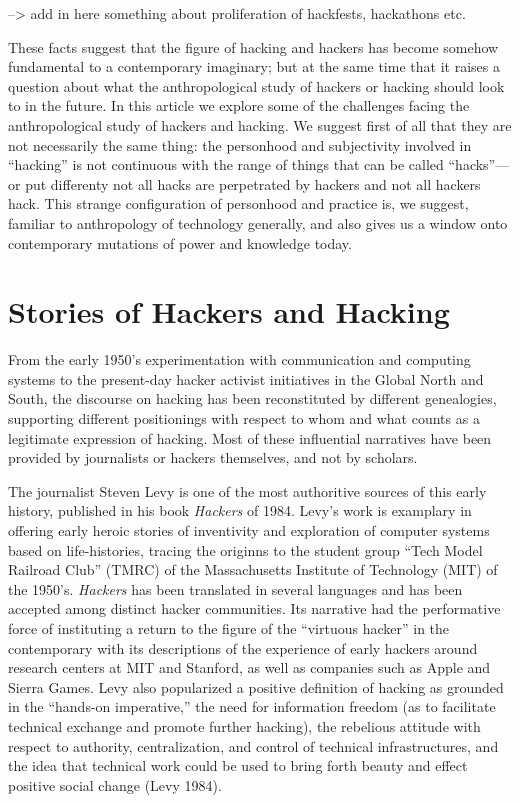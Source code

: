 \documentclass[10pt,letter,oneside]{scrartcl}
\begin{document}
--> add in here something about proliferation of hackfests, hackathons etc. 

These facts suggest that the figure of hacking and hackers has become somehow fundamental to a contemporary imaginary; but at the same time that it raises a question about what the anthropological study of hackers or hacking should look to in the future.  In this article we explore some of the challenges facing the anthropological study of hackers and hacking.  We suggest first of all that they are not necessarily the same thing:  the personhood and subjectivity involved in ``hacking'' is not continuous with the range of things that can be called ``hacks''---or put differenty not all hacks are perpetrated by hackers and not all hackers hack.   This strange configuration of personhood and practice is, we suggest, familiar to anthropology of technology generally, and also gives us a window onto contemporary mutations of power and knowledge today.

\section*{Stories of Hackers and Hacking}

From the early 1950's experimentation with communication and computing systems to the present-day hacker activist initiatives in the Global North and South, the discourse on hacking has been reconstituted by different genealogies, supporting different positionings with respect to whom and what counts as a legitimate expression of hacking.  Most of these influential narratives have been provided by journalists or hackers themselves, and not by scholars.  

The journalist Steven Levy is one of the most authoritive sources of this early history, published in his book \emph{Hackers} of 1984. Levy's work is examplary in offering early heroic stories of inventivity and exploration of computer systems based on life-histories, tracing the originns to the student group ``Tech Model Railroad Club'' (TMRC) of the Massachusetts Institute of Technology (MIT) of the 1950's. \emph{Hackers} has been translated in several languages and has been accepted among distinct hacker communities. Its narrative had the performative force of instituting a return to the figure of the ``virtuous hacker'' in the contemporary with its descriptions of the experience of early hackers around research centers at MIT and Stanford, as well as companies such as Apple and Sierra Games. Levy also popularized a positive definition of hacking as grounded in the ``hands-on imperative,'' the need for information freedom (as to facilitate technical exchange and promote further hacking), the rebelious attitude with respect to authority, centralization, and control of technical infrastructures, and the idea that technical work could be used to bring forth beauty and effect positive social change (Levy 1984).
\end{document}
